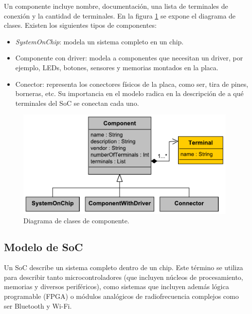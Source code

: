 Un componente incluye nombre, documentación, una lista de terminales de conexión y la cantidad de terminales. En la figura \ref{fig:Component} se expone el diagrama de clases. Existen los siguientes tipos de componentes:

\begin{itemize}
\item
\emph{SystemOnChip}: modela un sistema completo en un chip.
\item
Componente con driver: modela a componentes que necesitan un driver, por ejemplo, LEDs, botones, sensores y memorias montados en la placa.
\item
Conector: representa los conectores físicos de la placa, como ser, tira de pines, borneras, etc. Su importancia en el modelo radica en la descripción de a qué terminales del SoC se conectan cada uno.
\end{itemize}

\begin{figure}[!htbp]
\begin{center}  %
\includegraphics*[width=11cm]{Figures/Component.pdf}
\par\caption{Diagrama de clases de componente.}\label{fig:Component}
\end{center}
\end{figure}

\subsection{Modelo de SoC}

Un SoC describe un sistema completo dentro de un chip. Este término se utiliza para describir tanto microcontroladores (que incluyen núcleos de procesamiento, memorias y diversos periféricos), como sistemas que incluyen además lógica programable (FPGA) o módulos analógicos de radiofrecuencia complejos como ser Bluetooth y Wi-Fi.

